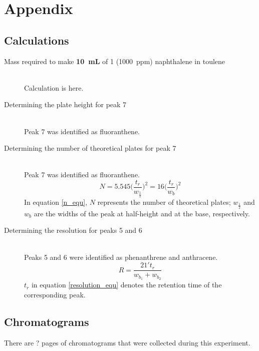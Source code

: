 \documentclass[a4paper, 12pt]{article}
\begin{document}
\section{Appendix}

\subsection{Calculations}

\begin{description}
	\item[Mass required to make \textbf{\SI{10}{mL}} of \SI{1}{} (\SI{1000}{ppm}) naphthalene in toulene] \hfill \\
	Calculation is here.
	\item[Determining the plate height for peak 7] \hfill \\
	Peak 7 was identified as fluoranthene.
	\item[Determining the number of theoretical plates for peak 7] \hfill \\
	Peak 7 was identified as fluoranthene.
	\begin{equation} \label{n_equ}
		N = 5.545\Bigg(\frac{t_r}{w_\frac{1}{2}}\Bigg)^2 = 16\Bigg(\frac{t_r}{w_b}\Bigg)^2
	\end{equation}
	In equation \ref{n_equ}, \(N\) represents the number of theoretical plates; \(w_\frac{1}{2}\) and \(w_b\) are the widths of the peak at half-height and at the base, respectively.
	\item[Determining the resolution for peaks 5 and 6] \hfill \\
	Peaks 5 and 6 were identified as phenanthrene and anthracene.
	\begin{equation} \label{resolution_equ}
		R = \frac{21't_r}{w_{b_1} + w_{b_2}}
	\end{equation}
	\(t_r\) in equation \ref{resolution_equ} denotes the retention time of the corresponding peak.
\end{description}

\subsection{Chromatograms}
There are ? pages of chromatograms that were collected during this experiment.


\end{document}
